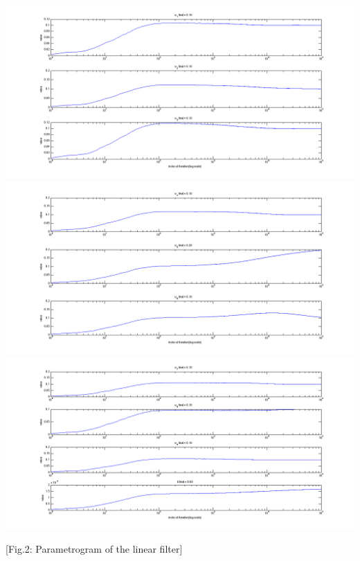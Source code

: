 \documentclass[12pt]{article}
\begin{document}
\hspace*{-6em}
\includegraphics[scale=.25]{../res/parametrogram1.png}
\hspace*{-2.5em}
\includegraphics[scale=.25]{../res/parametrogram2.png}
\hspace*{1.5em}
\includegraphics[scale=.35]{../res/parametrogram3.png}
\begin{center}
	[Fig.2: Parametrogram of the linear filter]
\end{center}
\end{document}
